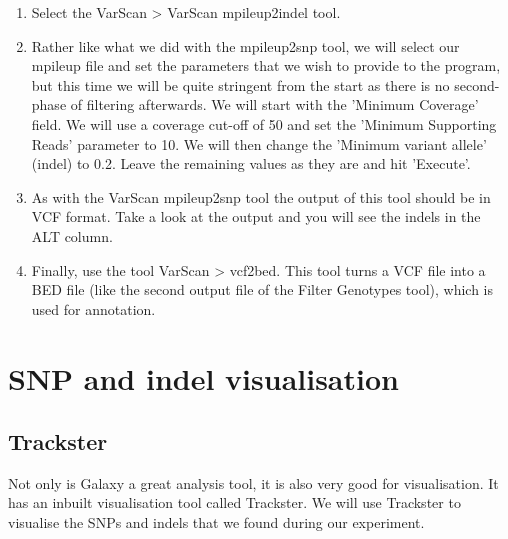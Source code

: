\documentclass[12pt,a4paper]{article}
\begin{document}
\begin{enumerate}
	\item Select the VarScan > VarScan mpileup2indel tool.   
	\item Rather like what we did with the mpileup2snp tool, we
          will select our mpileup file and set the parameters that we
          wish to provide to the program, but this time we will be
          quite stringent from the start as there is no second-phase
          of filtering afterwards. We will start with the 'Minimum
          Coverage' field. We will use a coverage cut-off of 50 and
          set the 'Minimum Supporting Reads' parameter to 10. We will
          then change the 'Minimum variant allele' (indel) to 0.2. Leave
          the remaining values as they are and hit 'Execute'.
	\item As with the VarScan mpileup2snp tool the output of this
          tool should be in VCF format. Take a look at the output and
          you will see the indels in the ALT column.
	\item Finally, use the tool VarScan > vcf2bed. This tool turns
          a VCF file into a BED file (like the second output file of
          the Filter Genotypes tool), which is used for annotation.
\end{enumerate}

\section{SNP and indel visualisation}

\subsection{Trackster}

Not only is Galaxy a great analysis tool, it is also very good for
visualisation. It has an inbuilt visualisation tool called
Trackster. We will use Trackster to visualise the SNPs and indels that
we found during our experiment.
\end{document}
